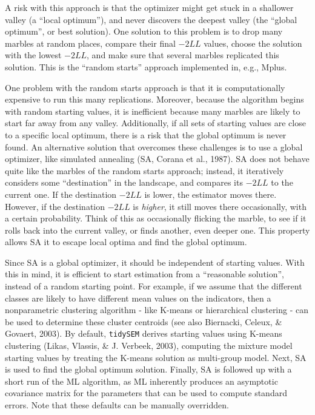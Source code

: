\documentclass[
  ,man,floatsintext]{apa6}
\begin{document}
A risk with this approach is that the optimizer might get stuck in a shallower valley (a ``local optimum''),
and never discovers the deepest valley (the ``global optimum'', or best solution).
One solution to this problem is to drop many marbles at random places,
compare their final \(-2LL\) values,
choose the solution
with the lowest \(-2LL\), and make sure that several marbles replicated
this solution.
This is the ``random starts'' approach implemented in, e.g., Mplus.

One problem with the random starts approach is that it is
computationally expensive to run this many replications. Moreover,
because the algorithm begins with random starting values,
it is inefficient because many marbles are likely to start far away from any valley.
Additionally, if all sets of starting values are close to a specific local optimum,
there is a risk that the global optimum is never found.
An alternative solution that overcomes these challenges is to use a global optimizer, like simulated annealing (SA, Corana et al., 1987).
SA does not behave quite like the marbles of the random starts approach;
instead, it iteratively considers some ``destination'' in the landscape,
and compares its \(-2LL\) to the current one.
If the destination \(-2LL\) is lower,
the estimator moves there.
However, if the destination \(-2LL\) is \emph{higher},
it still moves there occasionally, with a certain probability.
Think of this as occasionally flicking the marble,
to see if it rolls back into the current valley, or finds another,
even deeper one.
This property allows SA it to escape local optima and find the global optimum.

Since SA is a global optimizer, it should be independent of starting values.
With this in mind, it is efficient to start estimation from a ``reasonable solution'', instead of a random starting point.
For example, if we assume that the different classes are likely to have different mean values on the indicators,
then a nonparametric clustering algorithm - like K-means or hierarchical clustering - can be used to determine these cluster centroids (see also Biernacki, Celeux, \& Govaert, 2003).
By default, \texttt{tidySEM} derives starting values using K-means clustering (Likas, Vlassis, \& J. Verbeek, 2003),
computing the mixture model starting values by treating the K-means solution as multi-group model.
Next, SA is used to find the global optimum solution.
Finally, SA is followed up with a short run of the ML algorithm,
as ML inherently produces an asymptotic
covariance matrix for the parameters that can be used to compute
standard errors.
Note that these defaults can be manually overridden.
\end{document}

